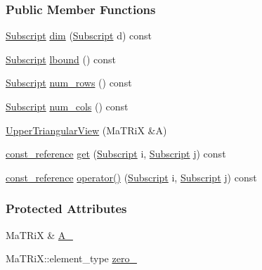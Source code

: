 \subsubsection*{Public Member Functions}
\begin{DoxyCompactItemize}
\item 
\hyperlink{namespace_t_n_t_af22e3f1460e145c04ce4e7d701e4c1c1}{Subscript} \hyperlink{class_t_n_t_1_1_upper_triangular_view_a2e130f3a1e9c8f90205932338383b08e}{dim} (\hyperlink{namespace_t_n_t_af22e3f1460e145c04ce4e7d701e4c1c1}{Subscript} d) const 
\item 
\hyperlink{namespace_t_n_t_af22e3f1460e145c04ce4e7d701e4c1c1}{Subscript} \hyperlink{class_t_n_t_1_1_upper_triangular_view_a7613bd1f8309b3dd61e8fa85e9604834}{lbound} () const 
\item 
\hyperlink{namespace_t_n_t_af22e3f1460e145c04ce4e7d701e4c1c1}{Subscript} \hyperlink{class_t_n_t_1_1_upper_triangular_view_a43eafa4c45d04785ebbcced01ff2dd18}{num\_\-rows} () const 
\item 
\hyperlink{namespace_t_n_t_af22e3f1460e145c04ce4e7d701e4c1c1}{Subscript} \hyperlink{class_t_n_t_1_1_upper_triangular_view_a1b5aa47d22452c0276b19291d6f17a81}{num\_\-cols} () const 
\item 
\hyperlink{class_t_n_t_1_1_upper_triangular_view_a0330ae9b4e2e8dc157fda566b5c296c0}{UpperTriangularView} (MaTRiX \&A)
\item 
\hyperlink{class_t_n_t_1_1_upper_triangular_view_aff1028a5fbca2d7cddb5a62809da560e}{const\_\-reference} \hyperlink{class_t_n_t_1_1_upper_triangular_view_a9082ce2e6c11bb96bfe80b5d89b3d7d9}{get} (\hyperlink{namespace_t_n_t_af22e3f1460e145c04ce4e7d701e4c1c1}{Subscript} i, \hyperlink{namespace_t_n_t_af22e3f1460e145c04ce4e7d701e4c1c1}{Subscript} j) const 
\item 
\hyperlink{class_t_n_t_1_1_upper_triangular_view_aff1028a5fbca2d7cddb5a62809da560e}{const\_\-reference} \hyperlink{class_t_n_t_1_1_upper_triangular_view_a50ffe96762187f06731fe42b2f98c343}{operator()} (\hyperlink{namespace_t_n_t_af22e3f1460e145c04ce4e7d701e4c1c1}{Subscript} i, \hyperlink{namespace_t_n_t_af22e3f1460e145c04ce4e7d701e4c1c1}{Subscript} j) const 
\end{DoxyCompactItemize}
\subsubsection*{Protected Attributes}
\begin{DoxyCompactItemize}
\item 
MaTRiX \& \hyperlink{class_t_n_t_1_1_upper_triangular_view_aaa61bcc4de9b2aa76e2a5e2b6d6e9c00}{A\_\-}
\item 
MaTRiX::element\_\-type \hyperlink{class_t_n_t_1_1_upper_triangular_view_a149d7f5679ebea3741c653f2a895018b}{zero\_\-}
\end{DoxyCompactItemize}


